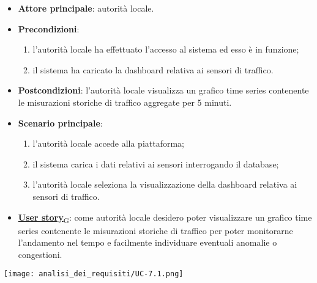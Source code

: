 \begin{itemize}
	\item \textbf{Attore principale}: autorità locale.
	\item \textbf{Precondizioni}:
	      \begin{enumerate}
		      \item l'autorità locale ha effettuato l'accesso al sistema ed esso è in funzione;
		      \item il sistema ha caricato la dashboard relativa ai sensori di traffico.
	      \end{enumerate}
	\item \textbf{Postcondizioni}: l'autorità locale visualizza un grafico time series contenente le misurazioni storiche di traffico aggregate per 5 minuti.
	\item \textbf{Scenario principale}:
	      \begin{enumerate}
		      \item l'autorità locale accede alla piattaforma;
		      \item il sistema carica i dati relativi ai sensori interrogando il database;
		      \item l'autorità locale seleziona la visualizzazione della dashboard relativa ai sensori di traffico.
	      \end{enumerate}
	\item \href{https://7last.github.io/docs/rtb/documentazione-interna/glossario\#user-story}{\textbf{User story}\textsubscript{G}}:
	      come autorità locale desidero poter visualizzare un grafico time series contenente le misurazioni storiche
	      di traffico per poter monitorarne l'andamento nel tempo e facilmente individuare eventuali anomalie
	      o congestioni.
\end{itemize}
\begin{center}
	\texttt{[image: analisi\_dei\_requisiti/UC-7.1.png]}
\end{center}


